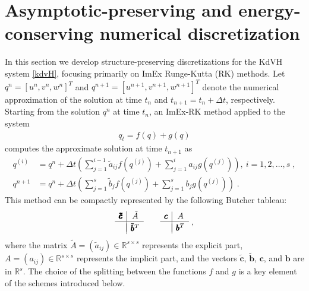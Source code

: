 \documentclass{article}
\newcommand{\tIcex}{\pmb{\tilde{c}}}
\newcommand{\tIAex}{\tilde{A}}
\newcommand{\tIbex}{\pmb{\tilde{b}}}
\newcommand{\tIcim}{\pmb{c}}
\newcommand{\tIAim}{A}
\newcommand{\tIbim}{\pmb{b}}
\begin{document}
\section{Asymptotic-preserving and energy-conserving numerical discretization}\label{sec:disc}
In this section we develop structure-preserving discretizations for the KdVH system \eqref{kdvH},
focusing primarily on ImEx Runge-Kutta (RK) methods.
Let $q^n = [u^n, v^n, w^n]^T$ and $q^{n+1} = [u^{n+1}, v^{n+1}, w^{n+1}]^T$ denote the
numerical approximation of the solution at time $t_n$ and $t_{n+1} = t_n + \Delta t$, respectively.
Starting from the solution $q^n$ at time $t_n$, an ImEx-RK method applied to the system
\begin{align*}
    q_t = f(q) + g(q)
\end{align*}
computes the approximate solution at time $t_{n+1}$ as
\begin{subequations}
\label{eq:ImEx_mthd}
\begin{align}
    q^{(i)} & = q^n + \Delta t \left(\sum_{j = 1}^{i-1} \tilde{a}_{ij} f(q^{(j)}) + \sum_{j = 1}^{i} a_{ij} g(q^{(j)}) \right), \ i = 1,2, \ldots, s \;, \label{Eq:ImEx_mthd_stage_type_I}\\
    q^{n+1} & = q^n + \Delta t \left( \sum_{j = 1}^{s} \tilde{b}_{j} f(q^{(j)}) + \sum_{j = 1}^{s} b_{j} g(q^{(j)}) \right)  \; \label{Eq:ImEx_mthd_sol_type_I}.
\end{align}
\end{subequations}
This method can be compactly represented by the following Butcher tableau:
\begin{equation}\label{Mthd:ImEx-RK}
    \begin{array}{c|ccc}
      \pmb{\tIcex} & \tIAex \\
      \hline
      & \\[-1em]
      & \tIbex^T \\
    \end{array}
    \qquad
    \begin{array}{c|ccc}
      \tIcim & \tIAim \\
      \hline
      & \\[-1em]
      & \tIbim^T \\
    \end{array} \;,
  \end{equation}
where the matrix $\tIAex = (\tilde{a}_{ij}) \in \mathbb{R}^{s \times s}$ represents the explicit part, $A = (a_{ij}) \in \mathbb{R}^{s \times s}$ represents the implicit part, and the vectors $\tIcex$, $\tIbex$, $\tIcim$, and $\tIbim$ are in $\mathbb{R}^{s}$.
The choice of the splitting between the functions $f$ and $g$ is a key element
of the schemes introduced below.
\end{document}
